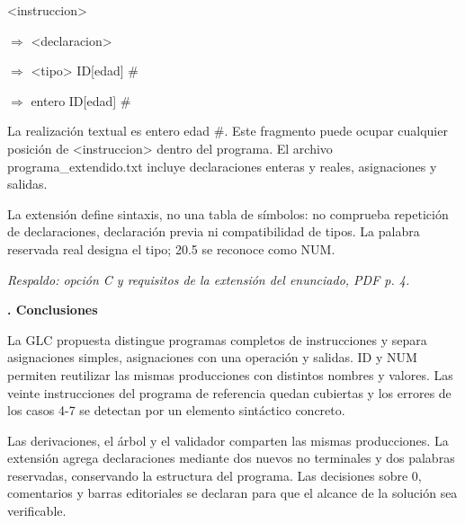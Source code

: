 \documentclass[10pt,a4paper]{article}
\newcommand{\ReportSection}[1]{\par{\color{Accent}\bfseries\fontsize{16}{20}\selectfont #1\par}\vspace{5pt}}
\newcommand{\ReportHeading}[1]{\par\addvspace{6pt}{\color{Accent}\bfseries\fontsize{10.8}{14}\selectfont #1\par}\nobreak\vspace{2pt}}
\begin{document}
\ReportHeading{Derivación por la izquierda}

\begingroup\setlength{\fboxsep}{6pt}
\noindent\colorbox{CodeBg}{%
\begin{minipage}{\dimexpr\linewidth-2\fboxsep\relax}
\ttfamily\fontsize{8.0}{10.5}\selectfont\raggedright
\setlength{\parindent}{0pt}\setlength{\parskip}{0pt}
\strut{}\textless{}instruccion\textgreater{}\par
\strut{}\ensuremath{\Rightarrow} \textless{}declaracion\textgreater{}\par
\strut{}\ensuremath{\Rightarrow} \textless{}tipo\textgreater{} ID[edad] \#\par
\strut{}\ensuremath{\Rightarrow} entero ID[edad] \#\par
\end{minipage}}\par\endgroup\vspace{5pt}

La realización textual es entero edad \#. Este fragmento puede ocupar cualquier posición de \textless{}instruccion\textgreater{} dentro del programa. El archivo programa\_\allowbreak{}extendido.txt incluye declaraciones enteras y reales, asignaciones y salidas.
\par

La extensión define sintaxis, no una tabla de símbolos: no comprueba repetición de declaraciones, declaración previa ni compatibilidad de tipos. La palabra reservada real designa el tipo; 20.5 se reconoce como NUM.
\par

\textit{Respaldo: opción C y requisitos de la extensión del enunciado, PDF p. 4.}
\par

\clearpage

\ReportSection{3. Conclusiones}

La GLC propuesta distingue programas completos de instrucciones y separa asignaciones simples, asignaciones con una operación y salidas. ID y NUM permiten reutilizar las mismas producciones con distintos nombres y valores. Las veinte instrucciones del programa de referencia quedan cubiertas y los errores de los casos 4-7 se detectan por un elemento sintáctico concreto.
\par

Las derivaciones, el árbol y el validador comparten las mismas producciones. La extensión agrega declaraciones mediante dos nuevos no terminales y dos palabras reservadas, conservando la estructura del programa. Las decisiones sobre 0, comentarios y barras editoriales se declaran para que el alcance de la solución sea verificable.
\par
\end{document}
